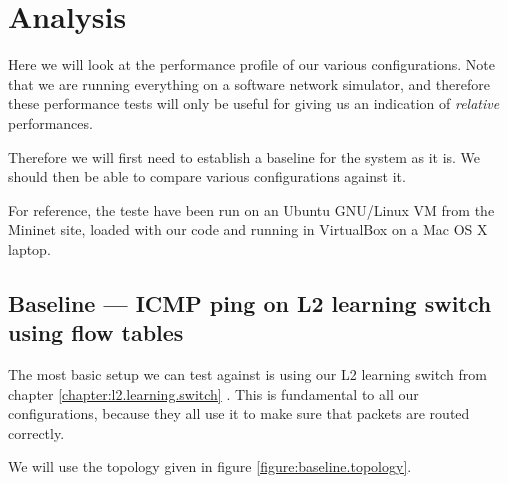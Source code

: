 \chapter{Analysis}

Here we will look at the performance profile of our various configurations.
Note that we are running everything on a software network simulator, and
therefore these performance tests will only be useful for giving us an
indication of \textit{relative} performances.

Therefore we will first need to establish a baseline for the system as it
is. We should then be able to compare various configurations against it.


For reference, the teste have been run on an Ubuntu GNU/Linux VM from the
Mininet site, loaded with our code and running in VirtualBox on a Mac OS X
laptop.

\section{Baseline --- ICMP ping on L2 learning switch using flow tables}

The most basic setup we can test against is using our L2 learning switch
from chapter \ref{chapter:l2.learning.switch}
.  This is fundamental to all our
configurations, because they all use it to make sure that packets are routed
correctly.

We will use the topology given in figure \ref{figure:baseline.topology}.

